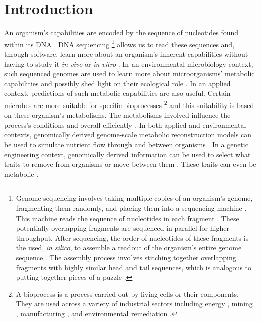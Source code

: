 \chapter{Introduction} \label{introduction}

An organism's capabilities are encoded by the sequence of nucleotides found within its DNA \cite{crick1970central}. DNA sequencing \footnote{Genome sequencing involves taking multiple copies of an organism's genome, fragmenting them randomly, and placing them into a sequencing machine \cite{shendure2017dna}. This machine reads the sequence of nucleotides in each fragment \cite{shendure2017dna}. These potentially overlapping fragments are sequenced in parallel for higher throughput. After sequencing, the order of nucleotides of these fragments is the used, \textit{in silico}, to assemble a readout of the organism's entire genome sequence \cite{wajid2012review}. The assembly process involves stitching together overlapping fragments with highly similar head and tail sequences, which is analogous to putting together pieces of a puzzle \cite{wajid2012review}.} allows us to read these sequences and, through software, learn more about an organism's inherent capabilities without having to study it \textit{in vivo} or \textit{in vitro} \cite{de2012bioinformatic}. In an environmental microbiology context, such sequenced genomes are used to learn more about microorganisms' metabolic capabilities and possibly shed light on their ecological role \cite{de2012bioinformatic}. In an applied context, predictions of such metabolic capabilities are also useful. Certain microbes are more suitable for specific bioprocesses \footnote{A bioprocess is a process carried out by living cells or their components. They are used across a variety of industrial sectors including energy \cite{deublein2011biogas}, mining \cite{dew1997biox}, manufacturing \cite{thodey2014microbial}, and environmental remediation \cite{alexander1999biodegradation}.} and this suitability is based on these organism's metabolisms. The metabolisms involved influence the process's conditions and overall efficiently \cite{doran1995bioprocess,liu2016bioprocess}. In both applied and environmental contexts, genomically derived genome-scale metabolic reconstruction models can be used to simulate nutrient flow through and between organisms \cite{magnusdottir2017generation, arkin2018kbase, faria2018improving}. In a genetic engineering context, genomically derived information can be used to select what traits to remove from organisms or move between them \cite{strohl2001biochemical}. These traits can even be metabolic \cite{sanchez2005novel}.

